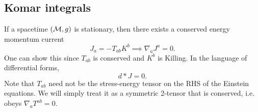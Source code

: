 \subsection*{Komar integrals}
If a spacetime $(\mathcal{M},g)$ is stationary, then there exists a conserved energy momentum current
\begin{equation}
    J_a = -T_{ab} K^b \implies \nabla_a J^a = 0.
\end{equation}
One can show this since $T_{ab}$ is conserved and $K^b$ is Killing. In the language of differential forms,
\begin{equation}
    d*J=0.
\end{equation}
Note that $T_{ab}$ need not be the stress-energy tensor on the RHS of the Einstein equations. We will simply treat it as a symmetric 2-tensor that is conserved, i.e. obeys $\nabla_a T^{ab}=0$.

